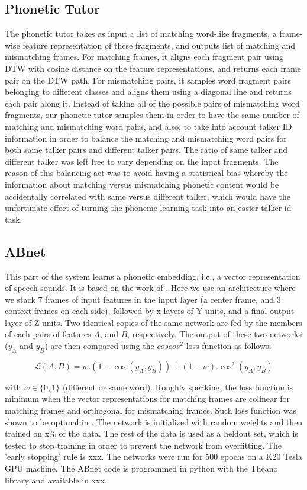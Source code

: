 \documentclass[a4paper]{article}
\begin{document}
\subsection{Phonetic Tutor}
The phonetic tutor takes as input a list of matching word-like fragments, a frame-wise feature representation of these fragments, and outputs list of matching and mismatching frames. For matching frames, it aligns each fragment pair using DTW with cosine distance on the feature representations, and returns each frame pair on the DTW path. For mismatching pairs, it samples word fragment pairs belonging to different classes and aligns them using a diagonal line and returns each pair along it. Instead of taking all of the possible pairs of mismatching word fragments, our phonetic tutor samples them in order to have the same number of matching and mismatching word pairs, and also, to take into account talker ID information in order to balance the matching and mismatching word pairs for both same talker pairs and different talker pairs. The ratio of same talker and different talker was left free to vary depending on the input fragments. The reason of this balancing act was to avoid having a statistical bias whereby the information about matching versus mismatching phonetic content would be accidentally correlated with same versus different talker, which would have the unfortunate effect of turning the phoneme learning task into an easier talker id task.

\subsection{ABnet}
This part of the system learns a phonetic embedding, i.e., a vector representation of speech sounds. It is based on the work of \cite{synnaeve&dupoux2014}. Here we use an architecture where we stack 7 frames of input features in the input layer (a center frame, and 3 context frames on each side), followed by x layers of Y units, and a final output layer of Z units. Two identical copies of the same network are fed by the members of each pairs of features $A$, and $B$, respectively. The output of these two networks ($y_A$ and $y_B$) are then compared using the $coscos^2$ loss function as follows:

\begin{equation}
\mathcal{L}(A,B) = w.(1-\cos(y_{A}, y_{B})) + (1-w).\cos^2(y_{A}, y_{B})
\end{equation}

with $w \in \{0,1\}$ (different or same word). Roughly speaking, the loss function is minimum when the vector representations for matching frames are colinear for matching frames and orthogonal for mismatching frames. Such loss function was shown to be optimal in \cite{synnaeve}. The network is initialized with random weights and then trained on x\% of the data. The rest of the data is used as a heldout set, which is tested to stop training in order to prevent the network from overfitting. The  'early stopping' rule is xxx. The networks were run for 500 epochs on a K20 Tesla GPU machine. The ABnet code is programmed in python with the Theano library and available in xxx.
\end{document}
